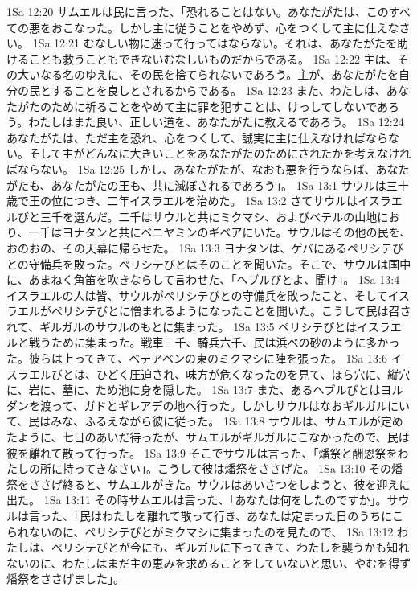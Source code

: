 1Sa 12:20  サムエルは民に言った、「恐れることはない。あなたがたは、このすべての悪をおこなった。しかし主に従うことをやめず、心をつくして主に仕えなさい。
1Sa 12:21  むなしい物に迷って行ってはならない。それは、あなたがたを助けることも救うこともできないむなしいものだからである。
1Sa 12:22  主は、その大いなる名のゆえに、その民を捨てられないであろう。主が、あなたがたを自分の民とすることを良しとされるからである。
1Sa 12:23  また、わたしは、あなたがたのために祈ることをやめて主に罪を犯すことは、けっしてしないであろう。わたしはまた良い、正しい道を、あなたがたに教えるであろう。
1Sa 12:24  あなたがたは、ただ主を恐れ、心をつくして、誠実に主に仕えなければならない。そして主がどんなに大きいことをあなたがたのためにされたかを考えなければならない。
1Sa 12:25  しかし、あなたがたが、なおも悪を行うならば、あなたがたも、あなたがたの王も、共に滅ぼされるであろう」。
1Sa 13:1  サウルは三十歳で王の位につき、二年イスラエルを治めた。
1Sa 13:2  さてサウルはイスラエルびと三千を選んだ。二千はサウルと共にミクマシ、およびベテルの山地におり、一千はヨナタンと共にベニヤミンのギベアにいた。サウルはその他の民を、おのおの、その天幕に帰らせた。
1Sa 13:3  ヨナタンは、ゲバにあるペリシテびとの守備兵を敗った。ペリシテびとはそのことを聞いた。そこで、サウルは国中に、あまねく角笛を吹きならして言わせた、「ヘブルびとよ、聞け」。
1Sa 13:4  イスラエルの人は皆、サウルがペリシテびとの守備兵を敗ったこと、そしてイスラエルがペリシテびとに憎まれるようになったことを聞いた。こうして民は召されて、ギルガルのサウルのもとに集まった。
1Sa 13:5  ペリシテびとはイスラエルと戦うために集まった。戦車三千、騎兵六千、民は浜べの砂のように多かった。彼らは上ってきて、ベテアベンの東のミクマシに陣を張った。
1Sa 13:6  イスラエルびとは、ひどく圧迫され、味方が危くなったのを見て、ほら穴に、縦穴に、岩に、墓に、ため池に身を隠した。
1Sa 13:7  また、あるヘブルびとはヨルダンを渡って、ガドとギレアデの地へ行った。しかしサウルはなおギルガルにいて、民はみな、ふるえながら彼に従った。
1Sa 13:8  サウルは、サムエルが定めたように、七日のあいだ待ったが、サムエルがギルガルにこなかったので、民は彼を離れて散って行った。
1Sa 13:9  そこでサウルは言った、「燔祭と酬恩祭をわたしの所に持ってきなさい」。こうして彼は燔祭をささげた。
1Sa 13:10  その燔祭をささげ終ると、サムエルがきた。サウルはあいさつをしようと、彼を迎えに出た。
1Sa 13:11  その時サムエルは言った、「あなたは何をしたのですか」。サウルは言った、「民はわたしを離れて散って行き、あなたは定まった日のうちにこられないのに、ペリシテびとがミクマシに集まったのを見たので、
1Sa 13:12  わたしは、ペリシテびとが今にも、ギルガルに下ってきて、わたしを襲うかも知れないのに、わたしはまだ主の恵みを求めることをしていないと思い、やむを得ず燔祭をささげました」。
